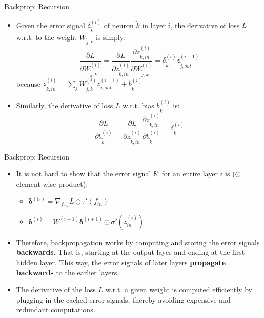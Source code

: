 \begin{frame} {Backprop: Recursion}
  \begin{itemize}
    \item Given the error signal $\delta_{\tilde{k}}^{(i)}$ of neuron $\tilde{k}$ in layer $i$, the derivative of loss $L$ w.r.t. to the weight $W_{\tilde{j},\tilde{k}}$ is simply:
        $$
           \frac{\partial L}{\partial W_{\tilde{j},\tilde{k}}^{(i)}} = \frac{\partial L}{\partial z_{\tilde{k},in}^{(i)}} \frac{\partial z_{\tilde{k},in}^{(i)}}{\partial W_{\tilde{j},\tilde{k}}^{(i)}} 
           = \delta_{\tilde{k}}^{(i)} z_{\tilde{j},out}^{(i-1)} $$
        because $z_{\tilde{k},in}^{(i)} = \sum_j W_{j,\tilde{k}}^{(i)}z_{j,out}^{(i-1)}  + b_{\tilde{k}}^{(i)}$
    \item Similarly, the derivative of loss $L$ w.r.t. bias $b_{\tilde{k}}^{(i)}$ is:
      $$ \frac{\partial L}{\partial b_{\tilde{k}}^{(i)}} = \frac{\partial L}{\partial z_{\tilde{k},in}^{(i)}} \frac{\partial z_{\tilde{k},in}^{(i)}}{\partial b_{\tilde{k}}^{(i)}} = \delta_{\tilde{k}}^{(i)}$$
  \end{itemize}
\end{frame}

\begin{frame} {Backprop: Recursion}
\begin{itemize}
\item It is not hard to show that the error signal $\bm{\delta}^{i}$ for an entire layer $i$ is ($\odot$ = element-wise product):
\begin{itemize}
\item $\bm{\delta}^{(O)} = \nabla_{f_{out}}L \odot \tau'(f_{in})$
\item $\bm{\delta}^{(i)} = W^{(i+1)}\bm{\delta}^{(i+1)} \odot \sigma'(z_{in}^{(i)})$
\end{itemize}
\item Therefore, backpropagation works by computing and storing the error signals \textbf{backwards}. That is, starting at the output layer and ending at the first hidden layer. This way, the error signals of later layers \textbf{propagate backwards} to the earlier layers.
\item The derivative of the loss $L$ w.r.t. a given weight is computed efficiently by plugging in the cached error signals, thereby avoiding expensive and redundant computations. 
\end{itemize}
\end{frame}

